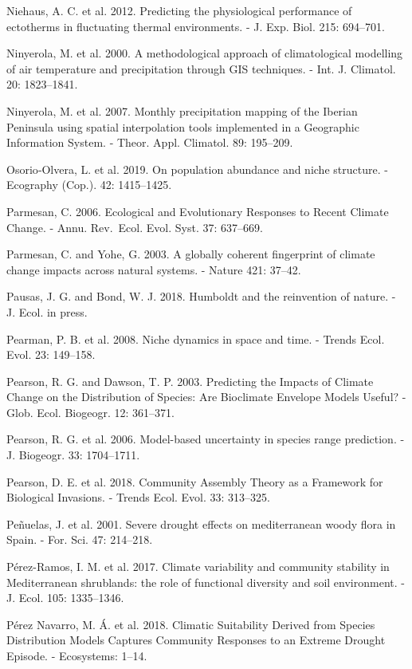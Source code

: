 \documentclass[11pt,twoside]{reedthesis}
\begin{document}
Niehaus, A. C. et al. 2012. Predicting the physiological performance of
ectotherms in fluctuating thermal environments. - J. Exp. Biol. 215:
694--701.\par
Ninyerola, M. et al. 2000. A methodological approach of climatological
modelling of air temperature and precipitation through GIS techniques. -
Int. J. Climatol. 20: 1823--1841.\par
Ninyerola, M. et al. 2007. Monthly precipitation mapping of the Iberian
Peninsula using spatial interpolation tools implemented in a Geographic
Information System. - Theor. Appl. Climatol. 89: 195--209.\par
Osorio‐Olvera, L. et al. 2019. On population abundance and niche
structure. - Ecography (Cop.). 42: 1415--1425.\par
Parmesan, C. 2006. Ecological and Evolutionary Responses to Recent
Climate Change. - Annu. Rev.~Ecol. Evol. Syst. 37: 637--669.\par
Parmesan, C. and Yohe, G. 2003. A globally coherent fingerprint of
climate change impacts across natural systems. - Nature 421: 37--42.\par
Pausas, J. G. and Bond, W. J. 2018. Humboldt and the reinvention of
nature. - J. Ecol. in press.\par
Pearman, P. B. et al. 2008. Niche dynamics in space and time. - Trends
Ecol. Evol. 23: 149--158.\par
Pearson, R. G. and Dawson, T. P. 2003. Predicting the Impacts of Climate
Change on the Distribution of Species: Are Bioclimate Envelope Models
Useful? - Glob. Ecol. Biogeogr. 12: 361--371.\par
Pearson, R. G. et al. 2006. Model-based uncertainty in species range
prediction. - J. Biogeogr. 33: 1704--1711.\par
Pearson, D. E. et al. 2018. Community Assembly Theory as a Framework for
Biological Invasions. - Trends Ecol. Evol. 33: 313--325.\par
Peñuelas, J. et al. 2001. Severe drought effects on mediterranean woody
flora in Spain. - For. Sci. 47: 214--218.\par
Pérez-Ramos, I. M. et al. 2017. Climate variability and community
stability in Mediterranean shrublands: the role of functional diversity
and soil environment. - J. Ecol. 105: 1335--1346.\par
Pérez Navarro, M. Á. et al. 2018. Climatic Suitability Derived from
Species Distribution Models Captures Community Responses to an Extreme
Drought Episode. - Ecosystems: 1--14.\par
\end{document}
